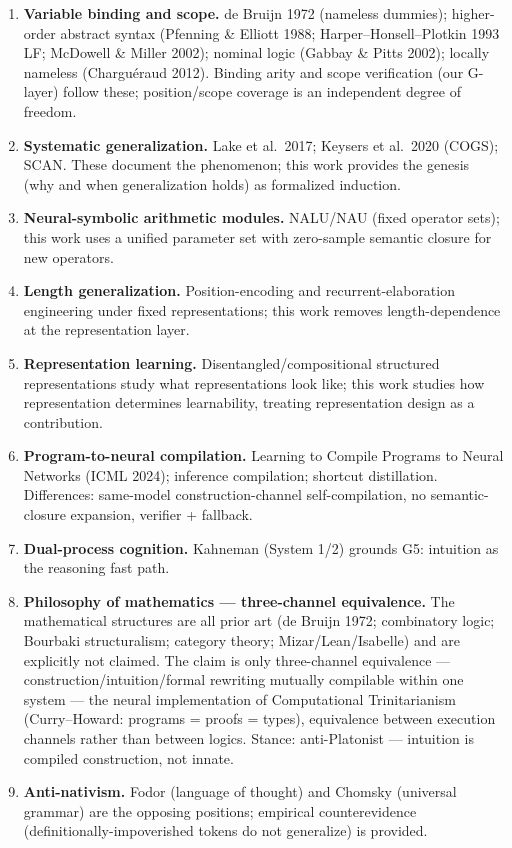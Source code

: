 \documentclass[
]{article}
\begin{document}
\begin{enumerate}
  typed code with explicit decoders (our survey of
  syntax-as-definable-object). This motivates the native-grammar design:
  grammar itself is tokens.
\item
  \textbf{Variable binding and scope.} de Bruijn 1972 (nameless
  dummies); higher-order abstract syntax (Pfenning \& Elliott 1988;
  Harper--Honsell--Plotkin 1993 LF; McDowell \& Miller 2002); nominal
  logic (Gabbay \& Pitts 2002); locally nameless (Charguéraud 2012).
  Binding arity and scope verification (our G-layer) follow these;
  position/scope coverage is an independent degree of freedom.
\item
  \textbf{Systematic generalization.} Lake et al.~2017; Keysers et
  al.~2020 (COGS); SCAN. These document the phenomenon; this work
  provides the genesis (why and when generalization holds) as formalized
  induction.
\item
  \textbf{Neural-symbolic arithmetic modules.} NALU/NAU (fixed operator
  sets); this work uses a unified parameter set with zero-sample
  semantic closure for new operators.
\item
  \textbf{Length generalization.} Position-encoding and
  recurrent-elaboration engineering under fixed representations; this
  work removes length-dependence at the representation layer.
\item
  \textbf{Representation learning.} Disentangled/compositional
  structured representations study what representations look like; this
  work studies how representation determines learnability, treating
  representation design as a contribution.
\item
  \textbf{Program-to-neural compilation.} Learning to Compile Programs
  to Neural Networks (ICML 2024); inference compilation; shortcut
  distillation. Differences: same-model construction-channel
  self-compilation, no semantic-closure expansion, verifier + fallback.
\item
  \textbf{Dual-process cognition.} Kahneman (System 1/2) grounds G5:
  intuition as the reasoning fast path.
\item
  \textbf{Philosophy of mathematics --- three-channel equivalence.} The
  mathematical structures are all prior art (de Bruijn 1972; combinatory
  logic; Bourbaki structuralism; category theory; Mizar/Lean/Isabelle)
  and are explicitly not claimed. The claim is only three-channel
  equivalence --- construction/intuition/formal rewriting mutually
  compilable within one system --- the neural implementation of
  Computational Trinitarianism (Curry--Howard: programs = proofs =
  types), equivalence between execution channels rather than between
  logics. Stance: anti-Platonist --- intuition is compiled construction,
  not innate.
\item
  \textbf{Anti-nativism.} Fodor (language of thought) and Chomsky
  (universal grammar) are the opposing positions; empirical
  counterevidence (definitionally-impoverished tokens do not generalize)
  is provided.
\end{enumerate}
\end{document}
